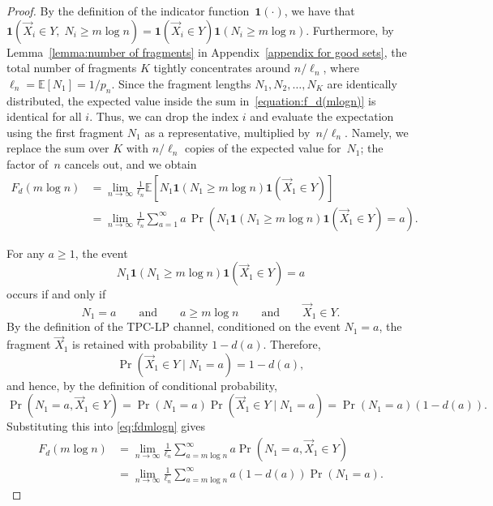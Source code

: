 \documentclass[journal,letterpaper,onecolumn,11pt]{IEEEtran}
\begin{document}
\begin{proof}
By the definition of the indicator function~$\mathbf{1}(\cdot)$, we have that $\mathbf{1}(\vec{X}_i\in Y,\;N_i\ge m\log n)=
\mathbf{1}(\vec{X}_i\in Y)\mathbf{1}(N_i\ge m\log n)$. 
Furthermore, by Lemma~\ref{lemma:number of fragments} in Appendix~\ref{appendix for good sets}, the total number of fragments $K$ tightly concentrates around $n/\ell_n$, where $\ell_n = \mathbb{E}[N_1]=1/p_n$. 
Since the fragment lengths $N_1, N_2, \dots, N_K$ are identically distributed, the expected value inside the sum in~\eqref{equation:f_d(mlogn)} is identical for all $i$. 
Thus, we can drop the index $i$ and evaluate the expectation using the first fragment $N_1$ as a representative, multiplied by~$n/\ell_n$.
Namely, we replace the sum over $K$ with $n/\ell_n$ copies of the expected value for~$N_1$; the factor of~$n$ cancels out, and we obtain %
\begin{align}\label{eq:fdmlogn}
F_d(m\log n)
&=
\lim_{n\to\infty}
\frac{1}{\ell_n}
\mathbb{E}\left[
N_1
\mathbf{1}({N_1\ge m\log n})
\mathbf{1}{(\vec{X}_1\in Y)}
\right] \nonumber\\
&=
\lim_{n\to\infty}
\frac{1}{\ell_n}
\sum_{a=1}^{\infty}
a\,
\Pr\left(
N_1
\mathbf{1}{(N_1\ge m\log n)}
\mathbf{1}{(\vec{X}_1\in Y)}
=a
\right).
\end{align}

For any \(a\ge 1\), the event
\[
N_1
\mathbf{1}{(N_1\ge m\log n)}
\mathbf{1}{(\vec{X}_1\in Y)}
=a
\]
occurs if and only if
\[
N_1=a\qquad\text{and}\qquad a\ge m\log n\qquad\text{and
}\qquad \vec{X}_1\in Y.
\]
 By the definition of the TPC-LP channel, conditioned on the event
\(N_1=a\), the fragment \(\vec X_1\) is retained with probability
\(1-d(a)\). Therefore,
\[
\Pr(\vec X_1\in Y\mid N_1=a)
=
1-d(a),
\]
and hence, by the definition of conditional probability,
\[
\Pr(N_1=a,\vec X_1\in Y)
=
\Pr(N_1=a)\Pr(\vec X_1\in Y\mid N_1=a)
=
\Pr(N_1=a)(1-d(a)).
\]
Substituting this into \eqref{eq:fdmlogn} gives
\begin{align}\label{eq:fdmlogn2}
F_d(m\log n)
&=
\lim_{n\to\infty}
\frac{1}{\ell_n}
\sum_{a=m\log n}^{\infty}
a\Pr\left(N_1=a,\vec{X}_1\in Y\right) \nonumber\\
&=
\lim_{n\to\infty}
\frac{1}{\ell_n}
\sum_{a= m\log n}^{\infty}
a(1-d(a))\Pr(N_1=a).
\end{align}




\end{proof}
\end{document}
